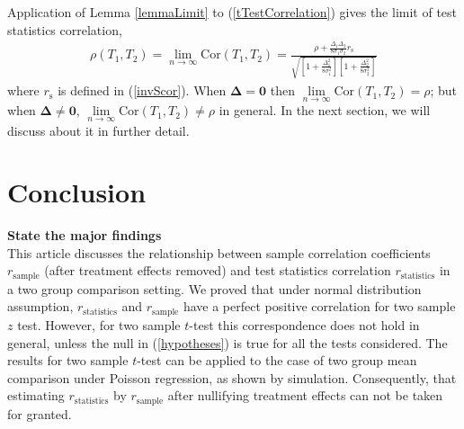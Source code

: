 \documentclass[12pt, a4paper]{article}
\begin{document}
	Application of Lemma \ref{lemmaLimit} to (\ref{tTestCorrelation}) gives the limit of test statistics
	correlation, 
	\begin{align}\label{limitT}
		\rho(T_1, T_2)=\lim\limits_{n \rightarrow \infty} \text{Cor}(T_1, T_2) = \frac{\rho +
			\frac{\Delta_1\Delta_2}{8\sigma_1\sigma_2}r_{\text{s}}}{\sqrt{  \left[ 1 +
				\frac{\Delta_1^2}{8\sigma_1^2}\right]\left[ 1 + \frac{\Delta_2^2}{8\sigma_2^2}\right]}}
	\end{align}
	where $r_{\text{s}}$ is defined in (\ref{invScor}). When $\bm \Delta = \bm 0$ then $\lim\limits_{n
		\rightarrow \infty} \text{Cor}(T_1, T_2) = \rho$; but when $\bm \Delta \neq \bm 0$, $\lim\limits_{n
		\rightarrow \infty} \text{Cor}(T_1, T_2) \neq \rho$ in general. In the next section, we will discuss
	about it in further detail. 
	
	
	
	
	\section{Conclusion}
	
	\textbf{State the major findings} \\
	This article discusses the relationship between sample correlation coefficients $r_{\text{sample}}$ 
	(after treatment effects removed) and test statistics correlation $r_\text{statistics}$ in a two
	group comparison setting. We proved that under normal distribution assumption, $r_\text{statistics}$
	and $r_\text{sample}$ have a perfect positive correlation for two sample $z$ test. However, for two
	sample $t$-test this correspondence does not hold in general, unless the null in (\ref{hypotheses})
	is true for all the tests considered. The results for two sample $t$-test can be applied to the case
	of two group mean comparison under Poisson regression, as shown by simulation. Consequently, that
	estimating  $r_\text{statistics}$ by $r_{\text{sample}}$ after nullifying treatment effects can not
	be taken for granted.
	
\end{document}
